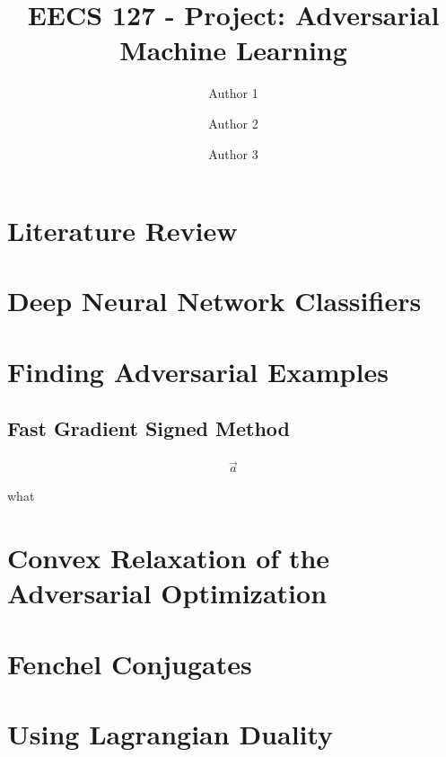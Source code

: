 \documentclass{amsart}
\title{EECS 127 - Project: Adversarial Machine Learning}  %
\author{Author 1}
\author{Author 2}  %
\author{Author 3}  %
\begin{document}
\maketitle

\tableofcontents

\pagebreak

\section{Literature Review}



\pagebreak

\section{Deep Neural Network Classifiers}



\pagebreak

\section{Finding Adversarial Examples}

\subsection{Fast Gradient Signed Method}

\begin{align*}
    \vec{a}
\end{align*}

what

\pagebreak

\section{Convex Relaxation of the Adversarial Optimization}



\pagebreak

\section{Fenchel Conjugates}



\pagebreak

\section{Using Lagrangian Duality}
\end{document}
